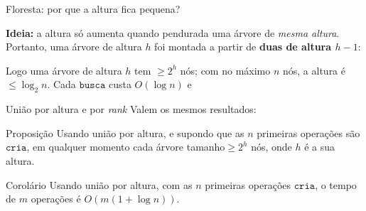 \documentclass[aspectratio=169,10pt]{beamer}
\newcommand{\Cria}{\mathtt{cria}}
\newcommand{\Busca}{\mathtt{busca}}
\begin{document}
\begin{frame}[c]{Floresta: por que a altura fica pequena?}

  \textbf{Ideia:} a altura só aumenta quando pendurada
  uma árvore de \textit{mesma altura}.  Portanto, uma árvore de altura
  $h$ foi montada a partir de \textbf{duas de altura $h-1$}:

  \medskip
  \centering

  \smallskip
  \raggedright
  Logo uma árvore de altura $h$ tem $\geq2^h$ nós; com no máximo $n$
  nós, a altura é $\leq\log_2n$.  Cada $\Busca$ custa $O(\log n)$ e

\end{frame}

\begin{frame}[c]{União por altura e por \textit{rank}}
 \vfill
  Valem os mesmos resultados:

   \vfill

  \begin{block}{Proposição}
    Usando união por altura, e supondo que as $n$ primeiras operações
    são $\Cria$, em qualquer momento cada árvore tamanho$\geq 2^h$ nós,
    onde $h$ é a sua altura.
  \end{block}

  \vfill
  
  \begin{block}{Corolário}
    Usando união por altura, com as $n$ primeiras operações $\Cria$, o
    tempo de $m$ operações é $O(m(1+\log n))$.
  \end{block}

   \vfill
\end{frame}
\end{document}
